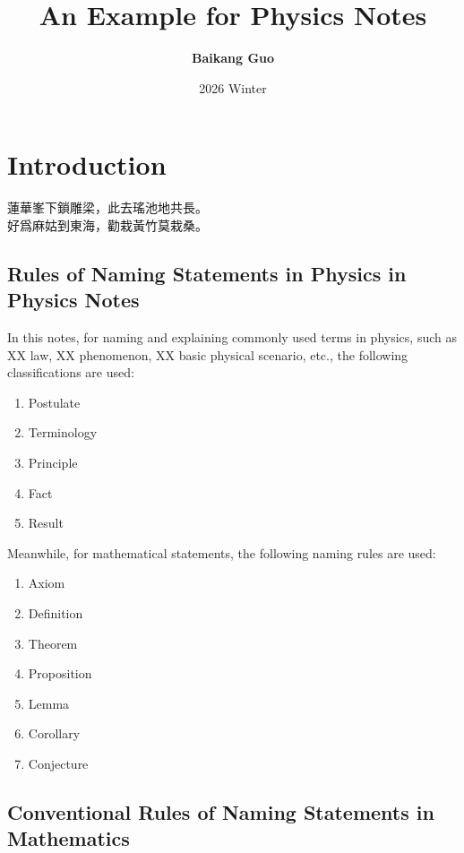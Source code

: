 \documentclass[oneside,10pt]{book}
\def\notetitle{An Example for Physics Notes}
\def\noteauthor{
    \textbf{Baikang Guo} \\ 
    }
\def\notedate{2026 Winter}
\begin{document}
\title{\textbf{
    \LARGE{\notetitle} \vspace*{10\baselineskip}}
    }
\author{\noteauthor}
\date{\notedate}

\maketitle
\newpage

\tableofcontents
\newpage

\chapter{Introduction}
\begin{flushright}
    蓮華峯下鎖雕梁，此去瑤池地共長。\\
    好爲麻姑到東海，勸栽黃竹莫栽桑。
\end{flushright}

\section{Rules of Naming Statements in Physics in Physics Notes}

In this notes, for naming and explaining commonly used terms in physics, such as XX law, XX phenomenon, XX basic physical scenario, etc., the following classifications are used:
\begin{enumerate}
    \item Postulate
    \item Terminology
    \item Principle
    \item Fact
    \item Result    
\end{enumerate}
Meanwhile, for mathematical statements, the following naming rules are used:
\begin{enumerate}
    \item Axiom
    \item Definition
    \item Theorem
    \item Proposition
    \item Lemma
    \item Corollary
    \item Conjecture
\end{enumerate}

\section{Conventional Rules of Naming Statements in Mathematics}
\end{document}
